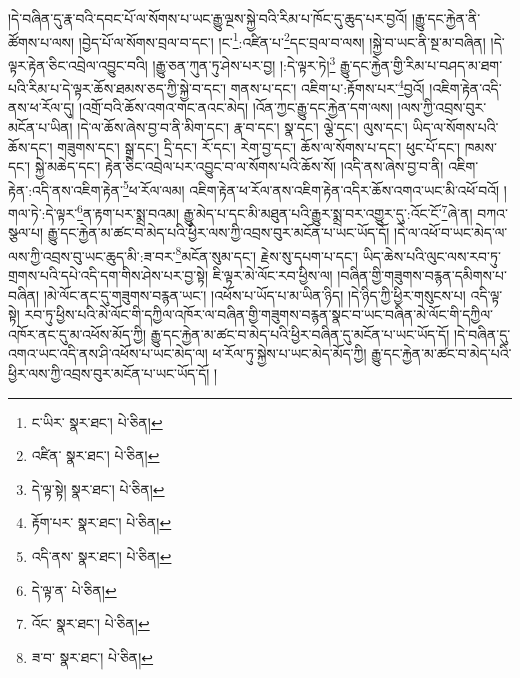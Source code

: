 །དེ་བཞིན་དུ་རྣ་བའི་དབང་པོ་ལ་སོགས་པ་ཡང་རྒྱུ་ལྔས་སྐྱེ་བའི་རིམ་པ་ཁོང་དུ་ཆུད་པར་བྱའོ། །རྒྱུ་དང་རྐྱེན་ནི་ཚོགས་པ་ལས། །བྱེད་པོ་ལ་སོགས་བྲལ་བ་དང་། །ང་\footnote{ང་ཡིར་  སྣར་ཐང་།  པེ་ཅིན། }:འཛིན་པ་\footnote{འཛིན་  སྣར་ཐང་།  པེ་ཅིན། }དང་བྲལ་བ་ལས། །སྐྱེ་བ་ཡང་ནི་སྔ་མ་བཞིན། །དེ་ལྟར་རྟེན་ཅིང་འབྲེལ་འབྱུང་བའི། །རྒྱུ་ཅན་ཀུན་ཏུ་ཤེས་པར་བྱ། །:དེ་ལྟར་ཏེ།\footnote{དེ་ལྟ་སྟེ།  སྣར་ཐང་།  པེ་ཅིན། } རྒྱུ་དང་རྐྱེན་གྱི་རིམ་པ་བཤད་མ་ཐག་པའི་རིམ་པ་དེ་ལྟར་ཆོས་ཐམས་ཅད་ཀྱི་སྐྱེ་བ་དང་། གནས་པ་དང་། འཇིག་པ་:རྟོགས་པར་\footnote{རྟོག་པར་  སྣར་ཐང་།  པེ་ཅིན། }བྱའོ། །འཇིག་རྟེན་འདི་ནས་ཕ་རོལ་དུ། །འགྲོ་བའི་ཆོས་འགའ་གང་ནའང་མེད། །འོན་ཀྱང་རྒྱུ་དང་རྐྱེན་དག་ལས། །ལས་ཀྱི་འབྲས་བུར་མངོན་པ་ཡིན། །དེ་ལ་ཆོས་ཞེས་བྱ་བ་ནི་མིག་དང་། རྣ་བ་དང་། སྣ་དང་། ལྕེ་དང་། ལུས་དང་། ཡིད་ལ་སོགས་པའི་ཆོས་དང་། གཟུགས་དང་། སྒྲ་དང་། དྲི་དང་། རོ་དང་། རེག་བྱ་དང་། ཆོས་ལ་སོགས་པ་དང་། ཕུང་པོ་དང་། ཁམས་དང་། སྐྱེ་མཆེད་དང་། རྟེན་ཅིང་འབྲེལ་པར་འབྱུང་བ་ལ་སོགས་པའི་ཆོས་སོ། །འདི་ནས་ཞེས་བྱ་བ་ནི། འཇིག་རྟེན་:འདི་ནས་འཇིག་རྟེན་\footnote{འདི་ནས་  སྣར་ཐང་།  པེ་ཅིན། }ཕ་རོལ་ལམ། འཇིག་རྟེན་ཕ་རོལ་ནས་འཇིག་རྟེན་འདིར་ཆོས་འགའ་ཡང་མི་འཕོ་བའོ། །གལ་ཏེ་:དེ་ལྟར་\footnote{དེ་ལྟ་ན་  པེ་ཅིན། }ན་རྟག་པར་སྨྲ་བའམ། རྒྱུ་མེད་པ་དང་མི་མཐུན་པའི་རྒྱུར་སྨྲ་བར་འགྱུར་དུ་:འོང་ངོ་\footnote{འོང་  སྣར་ཐང་།  པེ་ཅིན། }ཞེ་ན། བཀའ་སྩལ་པ། རྒྱུ་དང་རྐྱེན་མ་ཚང་བ་མེད་པའི་ཕྱིར་ལས་ཀྱི་འབྲས་བུར་མངོན་པ་ཡང་ཡོད་དོ། །དེ་ལ་འཕོ་བ་ཡང་མེད་ལ་ལས་ཀྱི་འབྲས་བུ་ཡང་ཆུད་མི་:ཟ་བར་\footnote{ཟ་བ་  སྣར་ཐང་།  པེ་ཅིན། }མངོན་སུམ་དང་། རྗེས་སུ་དཔག་པ་དང་། ཡིད་ཆེས་པའི་ལུང་ལས་རབ་ཏུ་གྲགས་པའི་དཔེ་འདི་དག་གིས་ཤེས་པར་བྱ་སྟེ། ཇི་ལྟར་མེ་ལོང་རབ་ཕྱིས་ལ། །བཞིན་གྱི་གཟུགས་བརྙན་དམིགས་པ་བཞིན། །མེ་ལོང་ནང་དུ་གཟུགས་བརྙན་ཡང་། །འཕོས་པ་ཡོད་པ་མ་ཡིན་ཉིད། །དེ་ཉིད་ཀྱི་ཕྱིར་གསུངས་པ། འདི་ལྟ་སྟེ། རབ་ཏུ་ཕྱིས་པའི་མེ་ལོང་གི་དཀྱིལ་འཁོར་ལ་བཞིན་གྱི་གཟུགས་བརྙན་སྣང་བ་ཡང་བཞིན་མེ་ལོང་གི་དཀྱིལ་འཁོར་ནང་དུ་མ་འཕོས་མོད་ཀྱི། རྒྱུ་དང་རྐྱེན་མ་ཚང་བ་མེད་པའི་ཕྱིར་བཞིན་དུ་མངོན་པ་ཡང་ཡོད་དོ། །དེ་བཞིན་དུ་འགའ་ཡང་འདི་ནས་ཤི་འཕོས་པ་ཡང་མེད་ལ། ཕ་རོལ་ཏུ་སྐྱེས་པ་ཡང་མེད་མོད་ཀྱི། རྒྱུ་དང་རྐྱེན་མ་ཚང་བ་མེད་པའི་ཕྱིར་ལས་ཀྱི་འབྲས་བུར་མངོན་པ་ཡང་ཡོད་དོ། །
